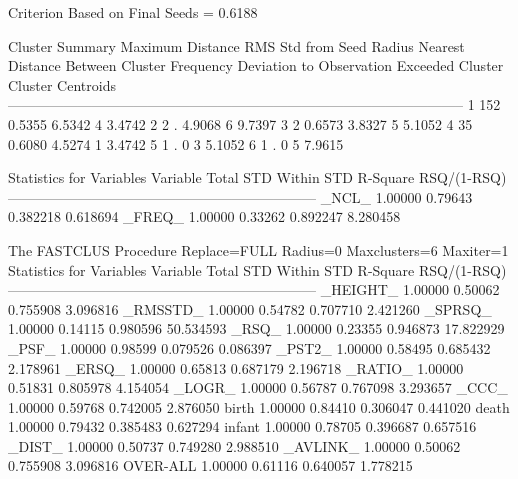 \documentclass{article}
\begin{document}
\begin{Woutput}
Criterion Based on Final Seeds =   0.6188

                                         Cluster Summary
                                      Maximum Distance
                           RMS Std           from Seed     Radius     Nearest     Distance Between
Cluster     Frequency    Deviation      to Observation    Exceeded    Cluster    Cluster Centroids
--------------------------------------------------------------------------------------------------
   1              152       0.5355              6.5342                      4               3.4742
   2                2            .              4.9068                      6               9.7397
   3                2       0.6573              3.8327                      5               5.1052
   4               35       0.6080              4.5274                      1               3.4742
   5                1            .                   0                      3               5.1052
   6                1            .                   0                      5               7.9615

                     Statistics for Variables
Variable     Total STD    Within STD      R-Square     RSQ/(1-RSQ)
------------------------------------------------------------------
_NCL_          1.00000       0.79643      0.382218        0.618694
_FREQ_         1.00000       0.33262      0.892247        8.280458

The FASTCLUS Procedure
Replace=FULL  Radius=0  Maxclusters=6 Maxiter=1
                     Statistics for Variables
Variable     Total STD    Within STD      R-Square     RSQ/(1-RSQ)
------------------------------------------------------------------
_HEIGHT_       1.00000       0.50062      0.755908        3.096816
_RMSSTD_       1.00000       0.54782      0.707710        2.421260
_SPRSQ_        1.00000       0.14115      0.980596       50.534593
_RSQ_          1.00000       0.23355      0.946873       17.822929
_PSF_          1.00000       0.98599      0.079526        0.086397
_PST2_         1.00000       0.58495      0.685432        2.178961
_ERSQ_         1.00000       0.65813      0.687179        2.196718
_RATIO_        1.00000       0.51831      0.805978        4.154054
_LOGR_         1.00000       0.56787      0.767098        3.293657
_CCC_          1.00000       0.59768      0.742005        2.876050
birth          1.00000       0.84410      0.306047        0.441020
death          1.00000       0.79432      0.385483        0.627294
infant         1.00000       0.78705      0.396687        0.657516
_DIST_         1.00000       0.50737      0.749280        2.988510
_AVLINK_       1.00000       0.50062      0.755908        3.096816
OVER-ALL       1.00000       0.61116      0.640057        1.778215


\end{Woutput}
\end{document}
